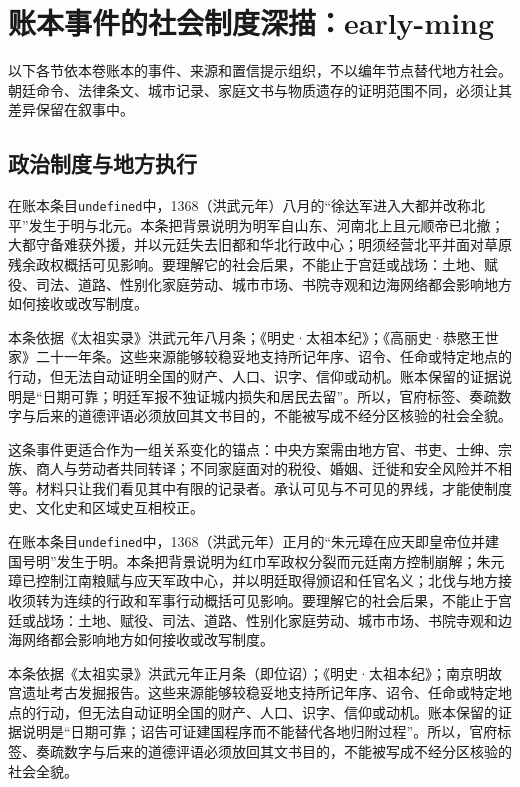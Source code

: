 \section{账本事件的社会制度深描：early-ming}

\label{sec:ledger-depth-early-ming}

以下各节依本卷账本的事件、来源和置信提示组织，不以编年节点替代地方社会。朝廷命令、法律条文、城市记录、家庭文书与物质遗存的证明范围不同，必须让其差异保留在叙事中。

\subsection{政治制度与地方执行}

在账本条目\texttt{undefined}中，1368（洪武元年）八月的“徐达军进入大都并改称北平”发生于明与北元。本条把背景说明为明军自山东、河南北上且元顺帝已北撤；大都守备难获外援，并以元廷失去旧都和华北行政中心；明须经营北平并面对草原残余政权概括可见影响。要理解它的社会后果，不能止于宫廷或战场：土地、赋役、司法、道路、性别化家庭劳动、城市市场、书院寺观和边海网络都会影响地方如何接收或改写制度。

本条依据《太祖实录》洪武元年八月条；《明史·太祖本纪》；《高丽史·恭愍王世家》二十一年条。这些来源能够较稳妥地支持所记年序、诏令、任命或特定地点的行动，但无法自动证明全国的财产、人口、识字、信仰或动机。账本保留的证据说明是“日期可靠；明廷军报不独证城内损失和居民去留”。所以，官府标签、奏疏数字与后来的道德评语必须放回其文书目的，不能被写成不经分区核验的社会全貌。

这条事件更适合作为一组关系变化的锚点：中央方案需由地方官、书吏、士绅、宗族、商人与劳动者共同转译；不同家庭面对的税役、婚姻、迁徙和安全风险并不相等。材料只让我们看见其中有限的记录者。承认可见与不可见的界线，才能使制度史、文化史和区域史互相校正。

在账本条目\texttt{undefined}中，1368（洪武元年）正月的“朱元璋在应天即皇帝位并建国号明”发生于明。本条把背景说明为红巾军政权分裂而元廷南方控制崩解；朱元璋已控制江南粮赋与应天军政中心，并以明廷取得颁诏和任官名义；北伐与地方接收须转为连续的行政和军事行动概括可见影响。要理解它的社会后果，不能止于宫廷或战场：土地、赋役、司法、道路、性别化家庭劳动、城市市场、书院寺观和边海网络都会影响地方如何接收或改写制度。

本条依据《太祖实录》洪武元年正月条（即位诏）；《明史·太祖本纪》；南京明故宫遗址考古发掘报告。这些来源能够较稳妥地支持所记年序、诏令、任命或特定地点的行动，但无法自动证明全国的财产、人口、识字、信仰或动机。账本保留的证据说明是“日期可靠；诏告可证建国程序而不能替代各地归附过程”。所以，官府标签、奏疏数字与后来的道德评语必须放回其文书目的，不能被写成不经分区核验的社会全貌。

